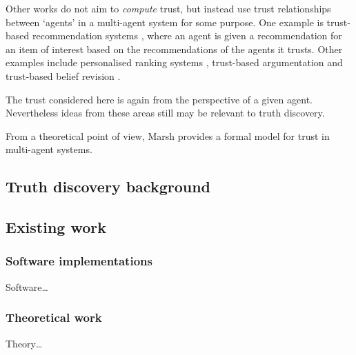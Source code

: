 \documentclass[../main.tex]{subfiles}
\begin{document}
Other works do not aim to \emph{compute} trust, but instead use trust
relationships between `agents' in a multi-agent system for some purpose. One
example is trust-based recommendation systems \cite{andersen}, where an agent
is given a recommendation for an item of interest based on the recommendations
of the agents it trusts. Other examples include personalised ranking systems
\cite{altman_personalised}, trust-based argumentation \cite{tang} and
trust-based belief revision \cite{booth}.

The trust considered here is again from the perspective of a given agent.
Nevertheless ideas from these areas still may be relevant to truth discovery.

From a theoretical point of view, Marsh \cite{marsh} provides a formal model
for trust in multi-agent systems.

\subsection{Truth discovery background}
\subsection{Existing work}
\subsubsection{Software implementations}
Software\ldots
\subsubsection{Theoretical work}
Theory\ldots
\end{document}

